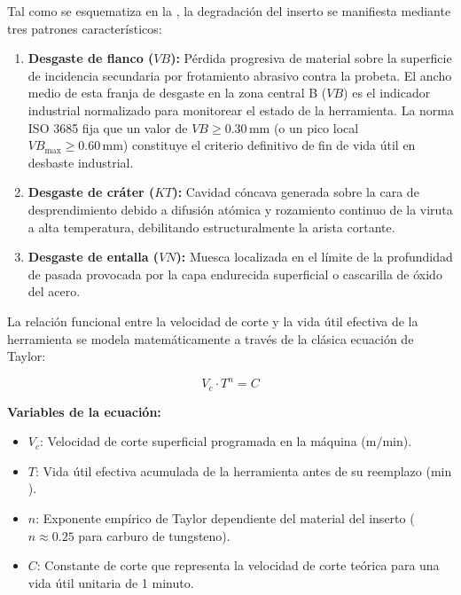 
Tal como se esquematiza en la , la degradación del inserto se manifiesta mediante tres patrones característicos:
\begin{enumerate}
    \item \textbf{Desgaste de flanco ($VB$):} Pérdida progresiva de material sobre la superficie de incidencia secundaria por frotamiento abrasivo contra la probeta. El ancho medio de esta franja de desgaste en la zona central B ($VB$) es el indicador industrial normalizado para monitorear el estado de la herramienta. La norma ISO 3685 fija que un valor de $VB \ge 0.30\,\text{mm}$ (o un pico local $VB_{\max} \ge 0.60\,\text{mm}$) constituye el criterio definitivo de fin de vida útil en desbaste industrial.
    \item \textbf{Desgaste de cráter ($KT$):} Cavidad cóncava generada sobre la cara de desprendimiento debido a difusión atómica y rozamiento continuo de la viruta a alta temperatura, debilitando estructuralmente la arista cortante.
    \item \textbf{Desgaste de entalla ($VN$):} Muesca localizada en el límite de la profundidad de pasada provocada por la capa endurecida superficial o cascarilla de óxido del acero.
\end{enumerate}

La relación funcional entre la velocidad de corte y la vida útil efectiva de la herramienta se modela matemáticamente a través de la clásica ecuación de Taylor:

\begin{equation}
V_c \cdot T^n = C
\label{eq:taylor}
\end{equation}

\noindent\textbf{Variables de la ecuación:}
\begin{itemize}
    \item $V_c$: Velocidad de corte superficial programada en la máquina ($\text{m/min}$).
    \item $T$: Vida útil efectiva acumulada de la herramienta antes de su reemplazo ($\text{min}$).
    \item $n$: Exponente empírico de Taylor dependiente del material del inserto ($n \approx 0.25$ para carburo de tungsteno).
    \item $C$: Constante de corte que representa la velocidad de corte teórica para una vida útil unitaria de 1 minuto.
\end{itemize}

